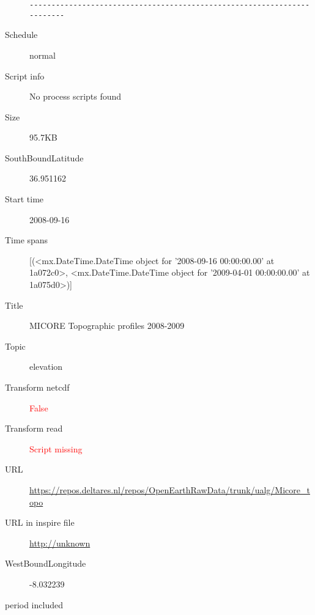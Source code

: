 \documentclass[9]{report}
\begin{document}
\begin{description}
\begin{verbatim}
------------------------------------------------------------------------

\end{verbatim}
  \item[Schedule] normal
  \item[Script info] No process scripts found
  \item[Size] 95.7KB
  \item[SouthBoundLatitude] 36.951162
  \item[Start time] 2008-09-16
  \item[Time spans] [(<mx.DateTime.DateTime object for '2008-09-16 00:00:00.00' at 1a072c0>, <mx.DateTime.DateTime object for '2009-04-01 00:00:00.00' at 1a075d0>)]
  \item[Title]  MICORE Topographic profiles 2008-2009 
  \item[Topic] elevation
  \item[Transform netcdf] \textcolor{red}{False}
  \item[Transform read] \textcolor{red}{Script missing}
  \item[URL] \href{https://repos.deltares.nl/repos/OpenEarthRawData/trunk/ualg/Micore\_topo}{https://repos.deltares.nl/repos/OpenEarthRawData/trunk/ualg/Micore\_topo}
  \item[URL in inspire file] \href{http://unknown}{http://unknown}
  \item[WestBoundLongitude] -8.032239
  \item[period included] 
\end{description}
\end{document}
